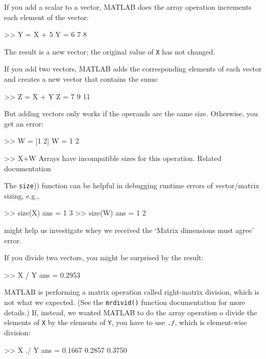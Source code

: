 If you add a scalar to a vector, MATLAB does the array operation increments each element of the vector:

\begin{code}
>> Y = X + 5
Y = 6     7     8
\end{code}

The result is a new vector; the original value of \lstinline{X} has not
changed.

If you add two vectors, MATLAB adds the corresponding elements of each
vector and creates a new vector that contains the sums:

\begin{code}
>> Z = X + Y
Z = 7     9    11
\end{code}

But adding vectors only works if the operands are the same size.
Otherwise, you get an error:

\begin{code}
>> W = [1 2]
W = 1     2

>> X+W
Arrays have incompatible sizes for this operation.
Related documentation 
\end{code}

The \lstinline(size()) function can be helpful in debugging runtime errors of vector/matrix sizing, e.g.,
\begin{code}
    >> size(X)
    ans =
         1     3
    >> size(W)
    ans =
         1     2
\end{code}
might help us investigate whey we received the `Matrix dimensions must agree' error.


If you divide two vectors, you might be surprised by the result:

\begin{code}
>> X / Y
ans = 0.2953
\end{code}

MATLAB is performing a matrix operation called right-matrix division, which is not what we expected.  (See the \lstinline{mrdivid()} function documentation for more details.)
If, instead, we wanted MATLAB to do the array operation o divide the elements of \lstinline{X} by the elements of \lstinline{Y}, you have to use \lstinline{./}, which is element-wise division:

\begin{code}
>> X ./ Y
ans = 0.1667    0.2857    0.3750
\end{code}

